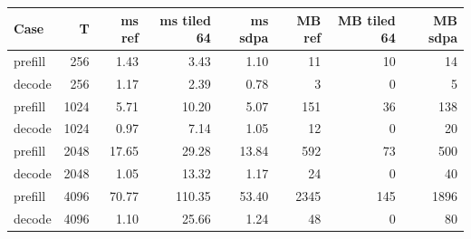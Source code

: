 \begin{tabular}{lrrrrrrr}
\toprule
Case & T & ms ref & ms tiled 64 & ms sdpa & MB ref & MB tiled 64 & MB sdpa \\
\midrule
prefill & 256 & 1.43 & 3.43 & 1.10 & 11 & 10 & 14 \\
decode & 256 & 1.17 & 2.39 & 0.78 & 3 & 0 & 5 \\
prefill & 1024 & 5.71 & 10.20 & 5.07 & 151 & 36 & 138 \\
decode & 1024 & 0.97 & 7.14 & 1.05 & 12 & 0 & 20 \\
prefill & 2048 & 17.65 & 29.28 & 13.84 & 592 & 73 & 500 \\
decode & 2048 & 1.05 & 13.32 & 1.17 & 24 & 0 & 40 \\
prefill & 4096 & 70.77 & 110.35 & 53.40 & 2345 & 145 & 1896 \\
decode & 4096 & 1.10 & 25.66 & 1.24 & 48 & 0 & 80 \\
\bottomrule
\end{tabular}
